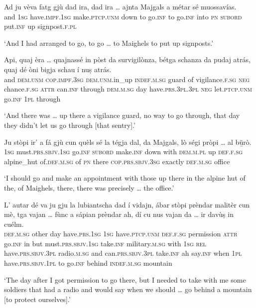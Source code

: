 \begin{linenumbers}
\gll Ad ju vèva fatg gjù dad ira, dad ira … ajnta Majgals a métar sé muossavías.\\
and \textsc{1sg} have.\textsc{impf.1sg} make.\textsc{ptcp.unm} down to  go.\textsc{inf} to go.\textsc{inf} {} into \textsc{pn} \textsc{subord} put.\textsc{inf} up signpost.\textsc{f.pl} \\
\end{linenumbers}
\medskip
\glt `And I had arranged to go, to go … to Maighels to put up signposts.'
\medskip

\begin{linenumbers}
\gll  Api, quaj èra … quajnassé in pòst da survigilònza, bétga schanza da pudaj atrás, quaj dé òni bigja schau í nuṣ atrás.\\
and \textsc{dem.unm} \textsc{cop.impf.3sg} {} \textsc{dem.unm}.in\_up \textsc{indef.m.sg} guard of vigilance.\textsc{f.sg} \textsc{neg} chance.\textsc{f.sg} \textsc{attr} can.\textsc{inf} through \textsc{dem.m.sg} day have.\textsc{prs.3pl.3pl} \textsc{neg} let.\textsc{ptcp.unm} go.\textsc{inf} \textsc{1pl} through  \\
\end{linenumbers}
\medskip
\glt `And there was … up there a vigilance guard, no way to go through, that day they didn’t let us go through [that sentry].'
\medskip

\begin{linenumbers}
\gll Ju stòpi ir’ a fá gjù cun quèls sé la tégja dal, da Majgals, lò ségi pròpi … al bü̱rò.   \\
 \textsc{1sg} must.\textsc{prs.sbjv.1sg} go.\textsc{inf} \textsc{subord} make.\textsc{inf} down with \textsc{dem.m.pl} up \textsc{def.f.sg} alpine\_hut of.\textsc{def.m.sg} of \textsc{pn} there \textsc{cop.prs.sbjv.3sg} exactly  {} \textsc{def.m.sg} office\\
\end{linenumbers}
\medskip
\glt `I should go and make an appointment with those up there in the alpine hut of the, of Maighels, there, there was precisely … the office.'
\medskip

\begin{linenumbers}
\gll  L’ autar dé va ju gju la lubiantscha dad í vidajn, ábar stòpi prèndar malitèr cun mè, tga vajan … fùnc a sápian prèndar ah, dí cu nus vajan da … ir davùṣ in cuélm.  \\
 \textsc{def.m.sg} other day have.\textsc{prs.1sg} \textsc{1sg} have.\textsc{ptcp.unm} \textsc{def.f.sg} permission \textsc{attr} go.\textsc{inf} in but must.\textsc{prs.sbjv.1sg} take.\textsc{inf} military.\textsc{m.sg} with \textsc{1sg} \textsc{rel} have.\textsc{prs.sbjv.3pl} {} radio.\textsc{m.sg} and can.\textsc{prs.sbjv.3pl} take.\textsc{inf} ah say.\textsc{inf} when \textsc{1pl} have.\textsc{prs.sbjv.1pl} to {} go.\textsc{inf} behind \textsc{indef.m.sg} mountain\\
\end{linenumbers}
\medskip
\glt `The day after I got permission to go there, but I needed to take with me some soldiers that had a radio and would say when we should … go behind a mountain [to protect ourselves].'
\medskip

